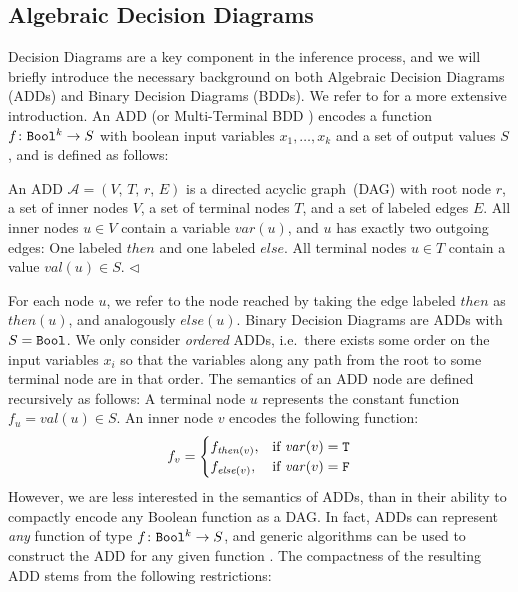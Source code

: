 \subsection{Algebraic Decision Diagrams}\label{sec:prelims_ADD}
Decision Diagrams are a key component in the inference process, and we will briefly introduce the necessary background on both Algebraic Decision Diagrams (ADDs) and Binary Decision Diagrams (BDDs).
We refer to \citet{husung2024oxidd,andersen1996introduction} for a more extensive introduction.
An ADD (or Multi-Terminal BDD \cite{fujita1997multi}) encodes a function $f \colon \texttt{Bool}^k \rightarrow S$ with boolean input variables $x_1,\dots, x_k$ and a set of output values $S$, and is defined as follows:%
%
\begin{definition}
	An ADD $\mathcal{A} = (V,\, T,\, r,\, E)$ is a directed acyclic graph~(DAG) with root node $r$, a set of inner nodes $V$, a set of terminal nodes $T$, and a set of labeled edges $E$.
	All inner nodes $u \in V$ contain a variable $\mathit{var}(u)$, and $u$ has exactly two outgoing edges: 
	One labeled $\mathit{then}$ and one labeled $\mathit{else}$.  
	All terminal nodes $u \in T$ contain a value $\mathit{val}(u) \in S$.
	\hfill$\triangleleft$
\end{definition}%
%
\noindent%
%
%
For each node $u$, we refer to the node reached by taking the edge labeled $\mathit{then}$ as $\mathit{then}(u)$, and analogously $\mathit{else}(u)$.
Binary Decision Diagrams \cite{bahar1993ADDs} are ADDs with $S = \texttt{Bool}$.
We only consider \textit{ordered} ADDs, i.e.\ there exists some order on the input variables $x_i$ so that the variables along any path from the root to some terminal node are in that order.
The semantics of an ADD node are defined recursively as follows:
A terminal node $u$ represents the constant function $f_u = \mathit{val}(u) \in S$.
An inner node $v$ encodes the following function:
$$f_v = \begin{cases}
	f_{\mathit{then}(v)}, & \text{if } \mathit{var}(v) = \texttt{T} \\
	f_{\mathit{else}(v)}, & \text{if } \mathit{var}(v) = \texttt{F}
\end{cases}$$%
%
However, we are less interested in the semantics of ADDs, than in their ability to compactly encode any Boolean function as a DAG.
In fact, ADDs can represent \emph{any} function of type $f \colon \texttt{Bool}^k \rightarrow S$, and generic algorithms can be used to construct the ADD for any given function \cite{fujita1997multi}.
The compactness of the resulting ADD stems from the following restrictions:
